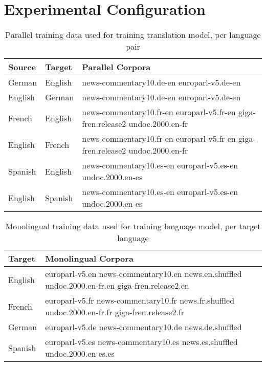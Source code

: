 \documentclass[11pt, a4paper]{article}
\begin{document}
\section{Experimental Configuration}
\label{Design}

\begin{table*}[htb]
\begin{center}
\begin{tabular}{|l|l|l|}
\hline
\bf Source & \bf Target & \bf Parallel Corpora \\ \hline
German & English & news-commentary10.de-en europarl-v5.de-en \\ \hline
English & German & news-commentary10.de-en europarl-v5.de-en \\ \hline
French & English & news-commentary10.fr-en europarl-v5.fr-en giga-fren.release2 undoc.2000.en-fr \\ \hline
English & French & news-commentary10.fr-en europarl-v5.fr-en giga-fren.release2 undoc.2000.en-fr \\ \hline
Spanish & English & news-commentary10.es-en europarl-v5.es-en undoc.2000.en-es \\ \hline
English & Spanish & news-commentary10.es-en europarl-v5.es-en undoc.2000.en-es  \\ \hline
\end{tabular}
\end{center}
\caption{Parallel training data used for training translation model, per language pair}
\label{parallelCorpora}
\end{table*}

\begin{table*}[htb]
\begin{center}
\begin{tabular}{|l|l|}
\hline
\bf Target & \bf Monolingual Corpora \\ \hline
English & europarl-v5.en news-commentary10.en news.en.shuffled undoc.2000.en-fr.en giga-fren.release2.en \\ \hline
French & europarl-v5.fr news-commentary10.fr news.fr.shuffled undoc.2000.en-fr.fr giga-fren.release2.fr \\ \hline
German & europarl-v5.de news-commentary10.de news.de.shuffled \\ \hline
Spanish & europarl-v5.es news-commentary10.es news.es.shuffled undoc.2000.en-es.es\\ \hline
\end{tabular}
\end{center}
\caption{Monolingual training data used for training language model, per target language}
\label{monolingualCorpora}
\end{table*}
\end{document}
